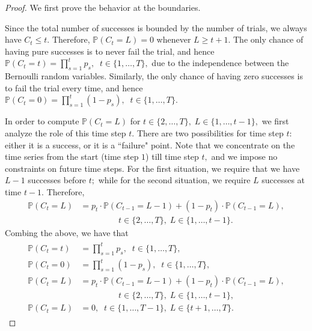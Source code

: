 \documentclass[10pt,a4paper]{amsart}
\begin{document}
\begin{proof}

We first prove the behavior at the boundaries.

Since the total number of successes is bounded by the number of trials, we always have $C_t\leq t.$ Therefore, $\mathbb{P}(C_t=L)=0$ whenever $ L\geq t+1.$ The only chance of having pure successes is to never fail the trial, and hence $\mathbb{P}(C_t=t) =\prod_{s=1}^t p_s, \;\; t\in\{1, \dots, T\},$ due to the independence between the Bernoulli random variables. Similarly, the only chance of having zero successes is to fail the trial every time, and hence $\mathbb{P}(C_t=0) =\prod_{s=1}^t(1-p_s), \;\; t\in\{1, \dots, T\}$.

In order to compute $\mathbb{P}(C_t=L)$ for $t\in\{2, \dots, T\},\;L\in\{1, \dots, t-1\},$ we first analyze the role of this time step $t$. There are two possibilities for time step $t$: either it is a success, or it is a ``failure" point. Note that we concentrate on the time series from the start (time step $1$) till time step $t,$ and we impose no constraints on future time steps. For the first situation, we require that we have $L-1$ successes before $t;$ while for the second situation, we require $L$ successes at time $t-1.$ Therefore, 
\begin{align*}
    \mathbb{P}(C_t=L) &=p_t\cdot\mathbb{P}(C_{t-1}=L-1)+ (1-p_t)\cdot \mathbb{P}(C_{t-1}=L), \\
    & \qquad \qquad \;\;t\in\{2, \dots, T\},\;L\in\{1, \dots, t-1\}.
\end{align*}
Combing the above, we have that 
\begin{align*}
\begin{split}
    \mathbb{P}(C_t=t) &=\prod_{s=1}^t p_s, \;\; t\in\{1, \dots, T\},\\
    \mathbb{P}(C_t=0) &=\prod_{s=1}^t(1-p_s), \;\; t\in\{1, \dots, T\},\\
    \mathbb{P}(C_t=L) &=p_t\cdot\mathbb{P}(C_{t-1}=L-1)+ (1-p_t)\cdot \mathbb{P}(C_{t-1}=L),\\
    & \qquad \qquad  \;\;t\in\{2, \dots, T\},\;L\in\{1, \dots, t-1\},\\
    \mathbb{P}(C_t=L)&=0,\;\;t\in\{1, \dots, T-1\}, \; L\in\{t+1, \dots, T\}.
\end{split}
\end{align*}
\end{proof}
\end{document}
